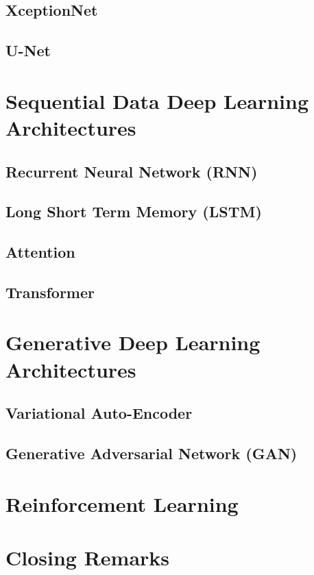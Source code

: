 \documentclass[10pt]{article}
\begin{document}
\subsection{XceptionNet}

\subsection{U-Net}

\section{Sequential Data Deep Learning Architectures}


\subsection{Recurrent Neural Network (RNN)}

\subsection{Long Short Term Memory (LSTM)}

\subsection{Attention}

\subsection{Transformer}

\section{Generative Deep Learning Architectures}

\subsection{Variational Auto-Encoder}

\subsection{Generative Adversarial Network (GAN)}

\section{Reinforcement Learning}

\section{Closing Remarks}
\end{document}
